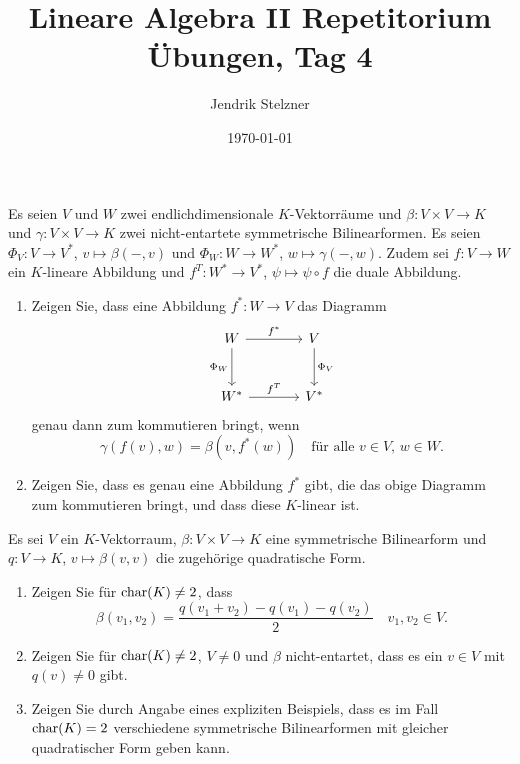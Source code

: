 \documentclass[a4paper, 10pt]{scrartcl}
\title{Lineare Algebra II Repetitorium \\ Übungen, Tag 4}
\author{Jendrik Stelzner}
\date{\today}
\begin{document}
\maketitle


\begin{question}
  Es seien $V$ und $W$ zwei endlichdimensionale $K$-Vektorräume und $\beta \colon V \times V \to K$ und $\gamma \colon V \times V \to K$ zwei nicht-entartete symmetrische Bilinearformen.
  Es seien $\Phi_V \colon V \to V^*$, $v \mapsto \beta(-,v)$ und $\Phi_W \colon W \to W^*$, $w \mapsto \gamma(-,w)$.
  Zudem sei $f \colon V \to W$ ein $K$-lineare Abbildung und $f^T \colon W^* \to V^*$, $\psi \mapsto \psi \circ f$ die duale Abbildung.
  \begin{enumerate}[leftmargin=*]
    \item
      Zeigen Sie, dass eine Abbildung $f^* \colon W \to V$ das Diagramm
      \[
        \begin{tikzcd}[row sep = large, column sep = large, ampersand replacement=\&]
              W
              \arrow{r}{f^*}
              \arrow{d}[left]{\Phi_W}
          \&  V
              \arrow{d}{\Phi_V}
          \\
              W^*
              \arrow{r}{f^T}
          \&  V^*
        \end{tikzcd}
      \]
      genau dann zum kommutieren bringt, wenn
      \[
        \gamma(f(v), w) = \beta(v, f^*(w))
        \quad
        \text{für alle $v \in V$, $w \in W$}.
      \]
    \item
      Zeigen Sie, dass es genau eine Abbildung $f^*$ gibt, die das obige Diagramm zum kommutieren bringt, und dass diese $K$-linear ist.
  \end{enumerate}
\end{question}


\begin{question}
  Es sei $V$ ein $K$-Vektorraum, $\beta \colon V \times V \to K$ eine symmetrische Bilinearform und $q \colon V \to K$, $v \mapsto \beta(v,v)$ die zugehörige quadratische Form.
  \begin{enumerate}[leftmargin=*]
    \item
      Zeigen Sie für $\operatorname{char}(K) \neq 2$, dass
      \[
          \beta(v_1, v_2)
        = \frac{q(v_1 + v_2) - q(v_1) - q(v_2)}{2}
        \quad
        \text{$v_1, v_2 \in V$}.
      \]
    \item
      Zeigen Sie für $\operatorname{char}(K) \neq 2$, $V \neq 0$ und $\beta$ nicht-entartet, dass es ein $v \in V$ mit $q(v) \neq 0$ gibt.
    \item
      Zeigen Sie durch Angabe eines expliziten Beispiels, dass es im Fall $\operatorname{char}(K) = 2$ verschiedene symmetrische Bilinearformen mit gleicher quadratischer Form geben kann.
  \end{enumerate}
\end{question}
\end{document}
